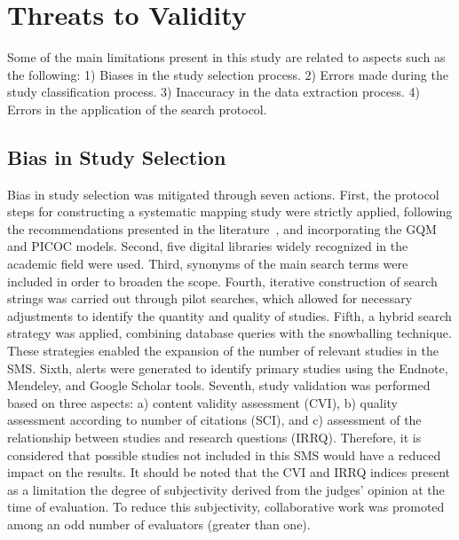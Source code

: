 \section{Threats to Validity}\label{sec:amenazas-validez}
Some of the main limitations present in this study are related to aspects such as the following: 1) Biases in the study selection process. 2) Errors made during the study classification process. 3) Inaccuracy in the data extraction process. 4) Errors in the application of the search protocol.

\subsection{Bias in Study Selection}
Bias in study selection was mitigated through seven actions.
First, the protocol steps for constructing a systematic mapping study were strictly applied, following the recommendations presented in the literature~\cite{Kitchenham2010792, budgen2008using}, and incorporating the GQM and PICOC models. Second, five digital libraries widely recognized in the academic field were used. Third, synonyms of the main search terms were included in order to broaden the scope. Fourth, iterative construction of search strings was carried out through pilot searches, which allowed for necessary adjustments to identify the quantity and quality of studies. Fifth, a hybrid search strategy was applied, combining database queries with the snowballing technique. These strategies enabled the expansion of the number of relevant studies in the SMS. Sixth, alerts were generated to identify primary studies using the Endnote, Mendeley, and Google Scholar tools. Seventh, study validation was performed based on three aspects: a) content validity assessment (CVI), b) quality assessment according to number of citations (SCI), and c) assessment of the relationship between studies and research questions (IRRQ). Therefore, it is considered that possible studies not included in this SMS would have a reduced impact on the results. It should be noted that the CVI and IRRQ indices present as a limitation the degree of subjectivity derived from the judges' opinion at the time of evaluation. To reduce this subjectivity, collaborative work was promoted among an odd number of evaluators (greater than one).

